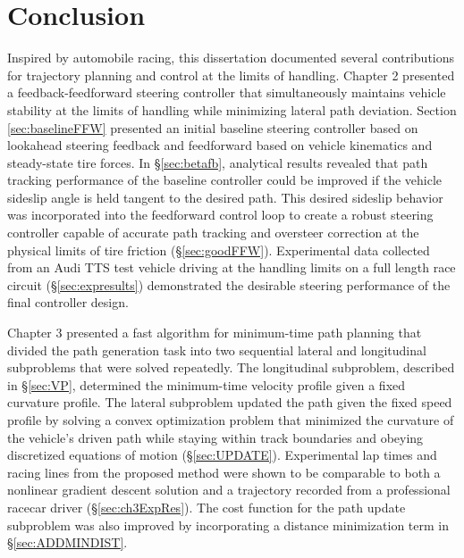 \chapter{Conclusion}
\label{chapter6}

Inspired by automobile racing, this dissertation documented several contributions for trajectory planning and control at the limits of handling.
Chapter 2 presented a feedback-feedforward steering controller that simultaneously maintains vehicle stability at the limits
of handling while minimizing lateral path deviation. Section \ref{sec:baselineFFW} presented an initial baseline 
steering controller based on lookahead steering feedback and feedforward based on vehicle kinematics and steady-state tire forces. In \S \ref{sec:betafb}, analytical results revealed that path tracking performance
 of the baseline controller could be improved if the vehicle sideslip angle is held tangent to the desired path. This desired sideslip behavior was incorporated into the
feedforward control loop to create a robust steering controller capable of accurate path 
tracking and oversteer correction at the physical limits of tire friction (\S \ref{sec:goodFFW}). Experimental data collected from an 
Audi TTS test vehicle driving at the handling limits on a full length race circuit (\S \ref{sec:expresults}) demonstrated the desirable steering performance of the final controller design. 

Chapter 3 presented a fast algorithm for 
minimum-time path planning that divided the path generation task into two sequential lateral and longitudinal subproblems that were
solved repeatedly. The longitudinal subproblem, described in \S \ref{sec:VP}, determined the minimum-time velocity profile given a fixed curvature profile. The lateral subproblem updated the path given the fixed speed profile by solving a convex optimization problem 
 that minimized the curvature of the vehicle's driven path while staying within track boundaries and obeying discretized equations of motion (\S \ref{sec:UPDATE}).
 Experimental lap times and racing lines from the proposed method were shown to be comparable to both a nonlinear gradient
 descent solution and a trajectory recorded from a professional racecar driver (\S \ref{sec:ch3ExpRes}). The cost function for the path update subproblem was
 also improved by incorporating a distance minimization term in \S \ref{sec:ADDMINDIST}. 

